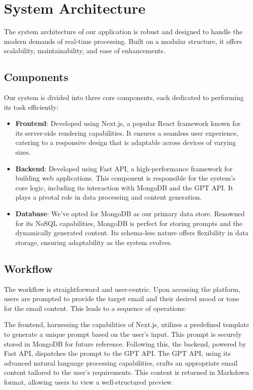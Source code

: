 \section{System Architecture}

The system architecture of our application is robust and designed to handle the modern demands of real-time processing. Built on a modular structure, it offers scalability, maintainability, and ease of enhancements.

\subsection{Components}
Our system is divided into three core components, each dedicated to performing its task efficiently:
\begin{itemize}
	\item \textbf{Frontend}: Developed using Next.js, a popular React framework known for its server-side rendering capabilities. It ensures a seamless user experience, catering to a responsive design that is adaptable across devices of varying sizes.
	      	          
	\item \textbf{Backend}: Developed using Fast API, a high-performance framework for building web applications. This component is responsible for the system's core logic, including its interaction with MongoDB and the GPT API. It plays a pivotal role in data processing and content generation.
	      	          
	\item \textbf{Database}: We've opted for MongoDB as our primary data store. Renowned for its NoSQL capabilities, MongoDB is perfect for storing prompts and the dynamically generated content. Its schema-less nature offers flexibility in data storage, ensuring adaptability as the system evolves.
\end{itemize}

\subsection{Workflow}
The workflow is straightforward and user-centric. Upon accessing the platform, users are prompted to provide the target email and their desired mood or tone for the email content. This leads to a sequence of operations:

The frontend, harnessing the capabilities of Next.js, utilizes a predefined template to generate a unique prompt based on the user's input. This prompt is securely stored in MongoDB for future reference. Following this, the backend, powered by Fast API, dispatches the prompt to the GPT API. The GPT API, using its advanced natural language processing capabilities, crafts an appropriate email content tailored to the user's requirements. This content is returned in Markdown format, allowing users to view a well-structured preview.

